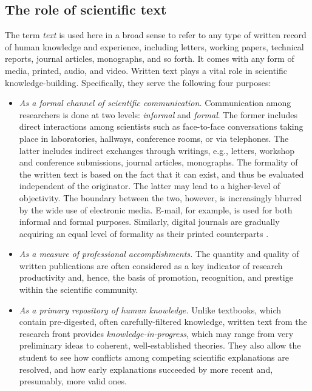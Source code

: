 \subsection{The role of scientific text}
\label{sec:role}

The term {\it text\/} is used here in a broad sense to refer to any type of
written record of human knowledge and experience, including letters,
working papers, technical reports, journal articles, monographs, and so
forth. It comes with any form of media, printed, audio, and video.  Written
text plays a vital role in scientific knowledge-building. Specifically,
they serve the following four purposes:

\begin{itemize}
\item {\it As a formal channel of scientific communication.\/}
  Communication among researchers is done at two levels: {\it informal\/}
  and {\it formal\/}. The former includes direct interactions among
  scientists such as face-to-face conversations taking place in
  laboratories, hallways, conference rooms, or via telephones. The latter
  includes indirect exchanges through writings, e.g., letters, workshop
  and conference submissions, journal articles, monographs. The formality
  of the written text is based on the fact that it can exist, and thus be
  evaluated independent of the originator. The latter may lead to a
  higher-level of objectivity. The boundary between the two, however, is
  increasingly blurred by the wide use of electronic media.  E-mail, for
  example, is used for both informal and formal purposes. Similarly,
  digital journals are gradually acquiring an equal level of formality as
  their printed counterparts \cite{Harnad91,Gaines92}.
  
\item {\it As a measure of professional accomplishments.\/} The quantity
  and quality of written publications are often considered as a key
  indicator of research productivity and, hence, the basis of promotion,
  recognition, and prestige within the scientific community.
    
\item {\it As a primary repository of human knowledge.\/} Unlike
  textbooks, which contain pre-digested, often carefully-filtered
  knowledge, written text from the research front provides {\it
  knowledge-in-progress\/}, which may range from very preliminary ideas
  to coherent, well-established theories. They also allow the student to
  see how conflicts among competing scientific explanations are resolved,
  and how early explanations succeeded by more recent and, presumably,
  more valid ones.
  

\end{itemize}

